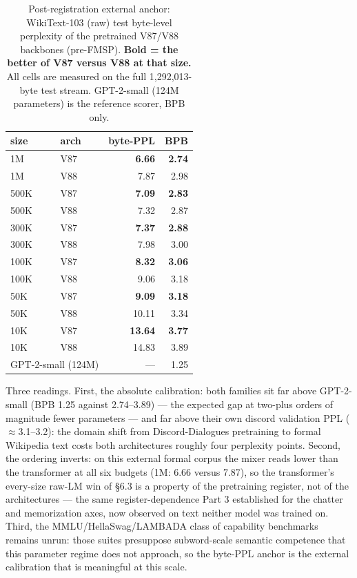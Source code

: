 \documentclass[11pt]{article}
\begin{document}
\begin{table}[!t]
\footnotesize
\caption{Post-registration external anchor: WikiText-103 (raw) test byte-level perplexity of the pretrained V87/V88 backbones (pre-FMSP). \textbf{Bold = the better of V87 versus V88 at that size.} All cells are measured on the full 1,292,013-byte test stream. GPT-2-small (124M parameters) is the reference scorer, BPB only.}
\label{tab:wikitext-anchor}
\centering
\begin{tabular}{llrr}
\toprule
size & arch & byte-PPL & BPB \\
\midrule
1M   & V87 & \textbf{6.66} & \textbf{2.74} \\
1M   & V88 & 7.87 & 2.98 \\
500K & V87 & \textbf{7.09} & \textbf{2.83} \\
500K & V88 & 7.32 & 2.87 \\
300K & V87 & \textbf{7.37} & \textbf{2.88} \\
300K & V88 & 7.98 & 3.00 \\
100K & V87 & \textbf{8.32} & \textbf{3.06} \\
100K & V88 & 9.06 & 3.18 \\
50K  & V87 & \textbf{9.09} & \textbf{3.18} \\
50K  & V88 & 10.11 & 3.34 \\
10K  & V87 & \textbf{13.64} & \textbf{3.77} \\
10K  & V88 & 14.83 & 3.89 \\
\midrule
\multicolumn{2}{l}{GPT-2-small (124M)} & --- & 1.25 \\
\bottomrule
\end{tabular}
\end{table}

Three readings. First, the absolute calibration: both families sit far above GPT-2-small (BPB 1.25 against 2.74--3.89) --- the expected gap at two-plus orders of magnitude fewer parameters --- and far above their own discord validation PPL ($\approx$3.1--3.2): the domain shift from Discord-Dialogues pretraining to formal Wikipedia text costs both architectures roughly four perplexity points. Second, the ordering inverts: on this external formal corpus the mixer reads lower than the transformer at all six budgets (1M: 6.66 versus 7.87), so the transformer's every-size raw-LM win of \S6.3 is a property of the pretraining register, not of the architectures --- the same register-dependence Part 3 established for the chatter and memorization axes, now observed on text neither model was trained on. Third, the MMLU/HellaSwag/LAMBADA class of capability benchmarks remains unrun: those suites presuppose subword-scale semantic competence that this parameter regime does not approach, so the byte-PPL anchor is the external calibration that is meaningful at this scale.
\end{document}
